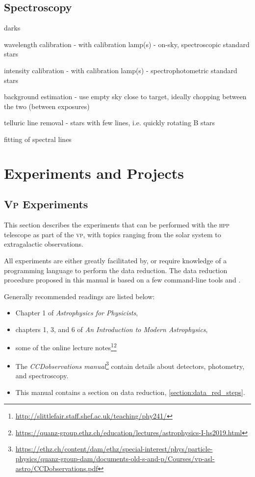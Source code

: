 \documentclass[a4paper, 11pt, fleqn]{memoir}
\begin{document}
\chapter{Spectroscopy}

darks

wavelength calibration - with calibration lamp(s) - on-sky, spectroscopic
standard stars

intensity calibration - with calibration lamp(s) - spectrophotometric standard
stars

background estimation - use empty sky close to target, ideally chopping between
the two (between exposures)

telluric line removal - stars with few lines, i.e. quickly rotating B stars

fitting of spectral lines

\part{Experiments and Projects}

\chapter{\textsc{Vp}
  Experiments}

This section describes the experiments that can be performed with the \textsc{hpp} telescope as part of the \textsc{vp}, with topics ranging from the solar system to extragalactic observations.

All experiments are either greatly facilitated by, or require knowledge of a programming language to perform the data reduction.
The data reduction procedure proposed in this manual is based on a few command-line tools and .

Generally recommended readings are listed below:
\begin{itemize}
    \item Chapter 1 of \emph{Astrophysics for Physicists}\autocite{Choudhuri}, \item chapters 1, 3, and 6 of \emph{An Introduction to Modern Astrophysics}\autocite{carroll2017introduction}, \item some of the online lecture notes\footnote{\url{http://slittlefair.staff.shef.ac.uk/teaching/phy241/}}\footnote{\url{https://quanz-group.ethz.ch/education/lectures/astrophysics-I-hs2019.html}} \item The \emph{CCDobservations manual}\footnote{\url{https://ethz.ch/content/dam/ethz/special-interest/phys/particle-physics/quanz-group-dam/documents-old-s-and-p/Courses/vp-asl-astro/CCDobservations.pdf}} contain details about detectors, photometry, and spectroscopy.
    \item
          This manual contains a section on data reduction,
          \cref{section:data_red_steps}.
\end{itemize}
\end{document}

